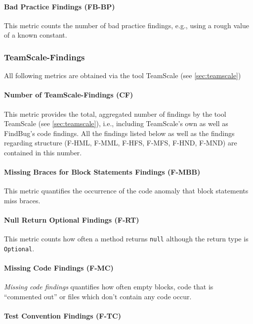 \documentclass{scrartcl}
\begin{document}
\paragraph{Bad Practice Findings (FB-BP)}

This metric counts the number of bad practice findings, e.g., using a rough
value of a known constant.

\subsubsection{TeamScale-Findings}

All following metrics are obtained via the tool TeamScale (see
\ref{sec:teamscale})

\paragraph{Number of TeamScale-Findings (CF)}

This metric provides the total, aggregated number of findings by the tool
TeamScale (see \ref{sec:teamscale}), i.e., including TeamScale's own as well as
FindBug's code findings. All the findings listed below as well as the findings
regarding structure (F-HML, F-MML, F-HFS, F-MFS, F-HND, F-MND) are contained in
this number.

\paragraph{Missing Braces for Block Statements Findings (F-MBB)}

This metric quantifies the occurrence of the code anomaly that block statements
miss braces.

\paragraph{Null Return Optional Findings (F-RT)}

This metric counts how often a method returns \texttt{null} although the return
type is \texttt{Optional}.

\paragraph{Missing Code Findings (F-MC)}

\emph{Missing code findings} quantifies how often empty blocks, code that is
\enquote{commented out} or files which don't contain any code occur.

\paragraph{Test Convention Findings (F-TC)}
\end{document}
